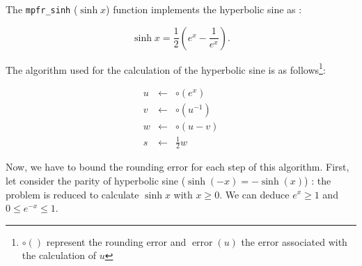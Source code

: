\documentclass[12pt]{amsart}
\DeclareMathOperator{\error}{error}
\begin{document}
The {\tt mpfr\_sinh} ($\sinh{x}$) function implements the hyperbolic
sine as :

\[\sinh x = \frac{1}{2} \left( e^{x} - \frac{1}{e^x} \right).\]

The algorithm used for the calculation of the hyperbolic sine is as follows\footnote{$\circ()$ represent the rounding error and $\error(u)$ the
  error associated with the calculation of $u$}:

\begin{eqnarray}\nonumber
u&\leftarrow&\circ(e^x)\\\nonumber
v&\leftarrow&\circ({u}^{-1})\\\nonumber
w&\leftarrow&\circ(u-v)\\\nonumber
s&\leftarrow&\frac{1}{2} w
\end{eqnarray}

Now, we have to bound the rounding error for each step of this
algorithm.  First, let consider the parity of hyperbolic sine
($\sinh(-x)=-\sinh(x)$) : the problem is reduced to calculate $\sinh x$
with $x \geq 0$. We can deduce $e^x \geq 1$ and $0 \leq e^{-x} \leq
1$.
\end{document}

